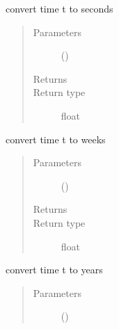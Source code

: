 \documentclass[letterpaper,10pt,english]{sphinxmanual}
\begin{document}
\begin{fulllineitems}
\begin{fulllineitems}
\label{\detokenize{Reference:salabim.Environment.to_seconds}}
convert time t to seconds
\begin{quote}\begin{description}
\item[{Parameters}] \leavevmode
{} () \textendash{} 

\item[{Returns}] \leavevmode
{}

\item[{Return type}] \leavevmode
float

\end{description}\end{quote}

\end{fulllineitems}


\begin{fulllineitems}
\label{\detokenize{Reference:salabim.Environment.to_weeks}}
convert time t to weeks
\begin{quote}\begin{description}
\item[{Parameters}] \leavevmode
{} () \textendash{} 

\item[{Returns}] \leavevmode
{}

\item[{Return type}] \leavevmode
float

\end{description}\end{quote}

\end{fulllineitems}


\begin{fulllineitems}
\label{\detokenize{Reference:salabim.Environment.to_years}}
convert time t to years
\begin{quote}\begin{description}
\item[{Parameters}] \leavevmode
{} () \textendash{} 


\end{description}
\end{quote}
\end{fulllineitems}
\end{fulllineitems}
\end{document}
